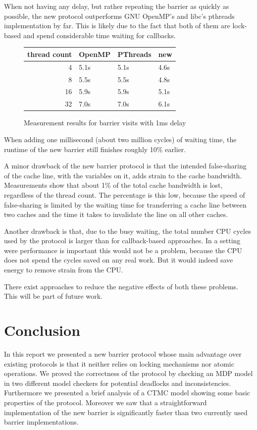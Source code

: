 \documentclass[a4paper, 10pt]{article}
\begin{document}
When not having any delay, but rather repeating the barrier as quickly as possible, the new protocol outperforms GNU OpenMP's and libc's pthreads implementation by far. This is likely due to the fact that both of them are lock-based and spend considerable time waiting for callbacks.

\begin{figure}[htbp]
	\centering
	\begin{tabular}{r | l l l}
		thread count& OpenMP & PThreads & new \\
		\hline
		 4          & 5.1s   & 5.1s     & 4.6s \\
		 8          & 5.5s   & 5.5s     & 4.8s \\
		16          & 5.9s   & 5.9s     & 5.1s \\
		32          & 7.0s   & 7.0s     & 6.1s \\
	\end{tabular}
	\caption{Measurement results for barrier visits with 1ms delay}
	\label{fig:measurement-2}
\end{figure}

When adding one millisecond (about two million cycles) of waiting time, the runtime of the new barrier still finishes roughly 10\% earlier.

A minor drawback of the new barrier protocol is that the intended false-sharing of the cache line, with the variables on it, adds strain to the cache bandwidth. Measurements show that about 1\% of the total cache bandwidth is lost, regardless of the thread count. The percentage is this low, because the speed of false-sharing is limited by the waiting time for transferring a cache line between two caches and the time it takes to invalidate the line on all other caches.

Another drawback is that, due to the busy waiting, the total number CPU cycles used by the protocol is larger than for callback-based approaches. In a setting were performance is important this would not be a problem, because the CPU does not spend the cycles saved on any real work. But it would indeed save energy to remove strain from the CPU.

There exist approaches to reduce the negative effects of both these problems. This will be part of future work.

\section{Conclusion}
In this report we presented a new barrier protocol whose main advantage over existing protocols is that it neither relies on locking mechanisms nor atomic operations.
We proved the correctness of the protocol by checking an MDP model in two different model checkers for potential deadlocks and inconsistencies.
Furthermore we presented a brief analysis of a CTMC model showing some basic properties of the protocol.
Moreover we saw that a straightforward implementation of the new barrier is significantly faster than two currently used barrier implementations.
\end{document}
